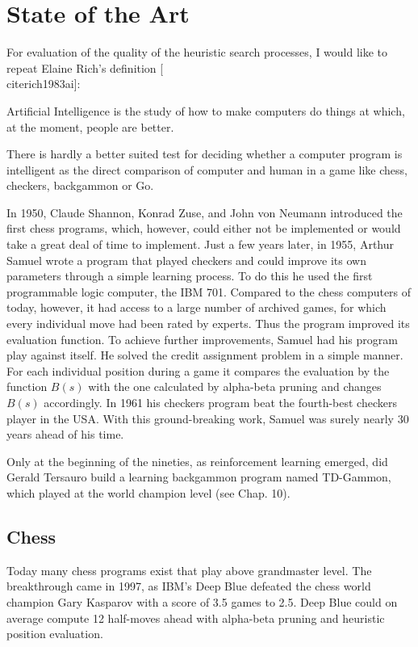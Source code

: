 \documentclass[10pt]{book}
\begin{document}
\section{State of the Art}
For evaluation of the quality of the heuristic search processes, I would like to repeat Elaine Rich's definition [\\cite{rich1983ai}]:

Artificial Intelligence is the study of how to make computers do things at which, at the moment, people are better.

There is hardly a better suited test for deciding whether a computer program is intelligent as the direct comparison of computer and human in a game like chess, checkers, backgammon or Go.

In 1950, Claude Shannon, Konrad Zuse, and John von Neumann introduced the first chess programs, which, however, could either not be implemented or would take a great deal of time to implement. Just a few years later, in 1955, Arthur Samuel wrote a program that played checkers and could improve its own parameters through a simple learning process. To do this he used the first programmable logic computer, the IBM 701. Compared to the chess computers of today, however, it had access to a large number of archived games, for which every individual move had been rated by experts. Thus the program improved its evaluation function. To achieve further improvements, Samuel had his program play against itself. He solved the credit assignment problem in a simple manner. For each individual position during a game it compares the evaluation by the function $B(s)$ with the one calculated by alpha-beta pruning and changes $B(s)$ accordingly. In 1961 his checkers program beat the fourth-best checkers player in the USA. With this ground-breaking work, Samuel was surely nearly 30 years ahead of his time.

Only at the beginning of the nineties, as reinforcement learning emerged, did Gerald Tersauro build a learning backgammon program named TD-Gammon, which played at the world champion level (see Chap. 10).

\subsection{Chess}
Today many chess programs exist that play above grandmaster level. The breakthrough came in 1997, as IBM's Deep Blue defeated the chess world champion Gary Kasparov with a score of 3.5 games to 2.5. Deep Blue could on average compute 12 half-moves ahead with alpha-beta pruning and heuristic position evaluation.
\end{document}
